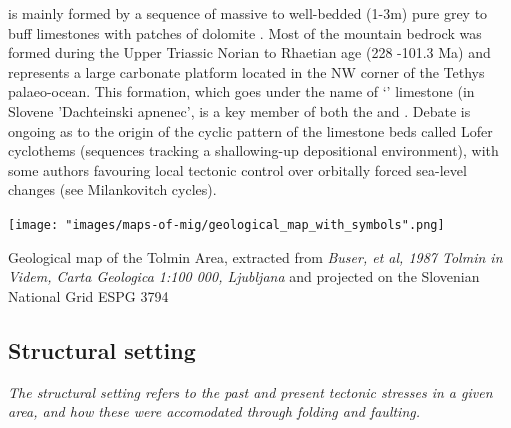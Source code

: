  is mainly formed by a sequence of massive to well-bedded (1-3m) pure grey to buff limestones with patches of dolomite \citep{buser1986tolmavc}. Most of the mountain bedrock was formed during the Upper Triassic Norian to Rhaetian age (228 -101.3 Ma) and represents a large carbonate platform located in the NW corner of the Tethys palaeo-ocean. This formation, which goes under the name of `' limestone (in Slovene 'Dachteinski apnenec', is a key member of both the  and . Debate is ongoing as to the origin of the cyclic pattern of the limestone beds called Lofer cyclothems (sequences tracking a shallowing-up depositional environment), with some authors favouring local tectonic control over orbitally forced sea-level changes (see Milankovitch cycles).



 \begin{pagemap}
 \checkoddpage \ifoddpage \forcerectofloat \else \forceversofloat \fi
\centering
  \texttt{[image: "images/maps-of-mig/geological\_map\_with\_symbols".png]}
  
  \caption{Geological map of the Tolmin Area, extracted from \textit{Buser, et al, 1987 Tolmin in Videm, Carta Geologica 1:100 000, Ljubljana} and projected on the Slovenian National Grid ESPG 3794}
  \label{map:mapofgeology}
 \end{pagemap}

\subsection{Structural setting}
\emph{The structural setting refers to the past and present tectonic stresses in a given area, and how these were accomodated through folding and faulting.}


